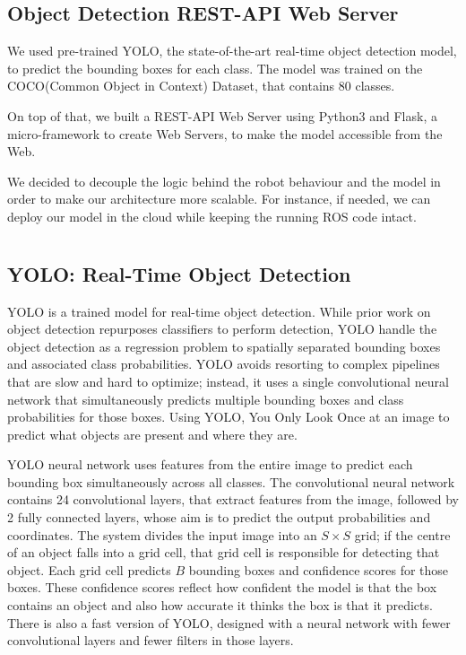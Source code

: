 \documentclass[letterpaper, 10 pt, conference]{ieeeconf}  %
\begin{document}
\subsection*{Object Detection REST-API Web Server}
We used pre-trained YOLO\cite{DBLP:conf/cvpr/RedmonDGF16}, the state-of-the-art real-time object detection model, to predict the bounding boxes for each class. The model was trained on the COCO(Common Object in Context)\cite{COCO} Dataset, that contains 80 classes. 

On top of that, we built a REST-API Web Server using Python3 and Flask, a micro-framework to create Web Servers, to make the model accessible from the Web.

We decided to decouple the logic behind the robot behaviour and the model in order to make our architecture more scalable. For instance, if needed, we can deploy our model in the cloud while keeping the running ROS code intact. 

\section{}

\subsection{YOLO: Real-Time Object Detection}

YOLO \cite{DBLP:conf/cvpr/RedmonDGF16} is a trained model for real-time object detection. While prior work on object detection repurposes classifiers to perform detection, YOLO handle the object detection as a regression problem to spatially separated bounding boxes and associated class probabilities. YOLO avoids resorting to complex pipelines that are slow and hard to optimize; instead, it uses a single convolutional neural network that simultaneously predicts multiple bounding boxes and class probabilities for those boxes. Using YOLO, You Only Look Once at an image to predict what objects are present and where they are.

YOLO neural network uses features from the entire image to predict each bounding box simultaneously across all classes. The convolutional neural network contains 24 convolutional layers, that extract features from the image, followed by 2 fully connected layers, whose aim is to predict the output probabilities and coordinates. The system divides the input image into an $S \times S$ grid; if the centre of an object falls into a grid cell, that grid cell is responsible for detecting that object. Each grid cell predicts $B$ bounding boxes and confidence scores for those boxes. These confidence scores reflect how confident the model is that the box contains an object and also how accurate it thinks the box is that it predicts. There is also a fast version of YOLO, designed with a neural network with fewer convolutional layers and fewer filters in those layers.
\end{document}

